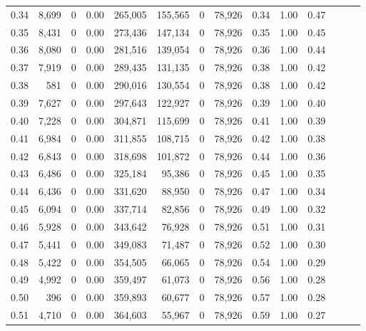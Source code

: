 \begin{tabular}{rrrrrrrrrrrrrr}
0.34 &   8,699 &      0 &  0.00 &  265,005 &  155,565 &       0 &  78,926 &  0.34 &  1.00 &      0.47 \\
0.35 &   8,431 &      0 &  0.00 &  273,436 &  147,134 &       0 &  78,926 &  0.35 &  1.00 &      0.45 \\
0.36 &   8,080 &      0 &  0.00 &  281,516 &  139,054 &       0 &  78,926 &  0.36 &  1.00 &      0.44 \\
0.37 &   7,919 &      0 &  0.00 &  289,435 &  131,135 &       0 &  78,926 &  0.38 &  1.00 &      0.42 \\
0.38 &     581 &      0 &  0.00 &  290,016 &  130,554 &       0 &  78,926 &  0.38 &  1.00 &      0.42 \\
0.39 &   7,627 &      0 &  0.00 &  297,643 &  122,927 &       0 &  78,926 &  0.39 &  1.00 &      0.40 \\
0.40 &   7,228 &      0 &  0.00 &  304,871 &  115,699 &       0 &  78,926 &  0.41 &  1.00 &      0.39 \\
0.41 &   6,984 &      0 &  0.00 &  311,855 &  108,715 &       0 &  78,926 &  0.42 &  1.00 &      0.38 \\
0.42 &   6,843 &      0 &  0.00 &  318,698 &  101,872 &       0 &  78,926 &  0.44 &  1.00 &      0.36 \\
0.43 &   6,486 &      0 &  0.00 &  325,184 &   95,386 &       0 &  78,926 &  0.45 &  1.00 &      0.35 \\
0.44 &   6,436 &      0 &  0.00 &  331,620 &   88,950 &       0 &  78,926 &  0.47 &  1.00 &      0.34 \\
0.45 &   6,094 &      0 &  0.00 &  337,714 &   82,856 &       0 &  78,926 &  0.49 &  1.00 &      0.32 \\
0.46 &   5,928 &      0 &  0.00 &  343,642 &   76,928 &       0 &  78,926 &  0.51 &  1.00 &      0.31 \\
0.47 &   5,441 &      0 &  0.00 &  349,083 &   71,487 &       0 &  78,926 &  0.52 &  1.00 &      0.30 \\
0.48 &   5,422 &      0 &  0.00 &  354,505 &   66,065 &       0 &  78,926 &  0.54 &  1.00 &      0.29 \\
0.49 &   4,992 &      0 &  0.00 &  359,497 &   61,073 &       0 &  78,926 &  0.56 &  1.00 &      0.28 \\
0.50 &     396 &      0 &  0.00 &  359,893 &   60,677 &       0 &  78,926 &  0.57 &  1.00 &      0.28 \\
0.51 &   4,710 &      0 &  0.00 &  364,603 &   55,967 &       0 &  78,926 &  0.59 &  1.00 &      0.27 \\

\end{tabular}
